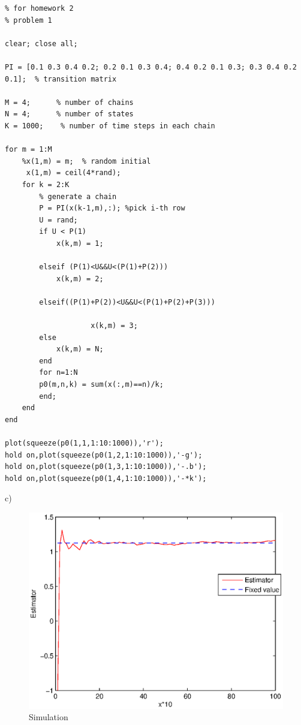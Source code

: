 \documentclass[12pt] {article}
\begin{document}
\begin{lstlisting}
% for homework 2
% problem 1

clear; close all;

PI = [0.1 0.3 0.4 0.2; 0.2 0.1 0.3 0.4; 0.4 0.2 0.1 0.3; 0.3 0.4 0.2 0.1];  % transition matrix

M = 4;      % number of chains
N = 4;      % number of states
K = 1000;    % number of time steps in each chain

for m = 1:M
    %x(1,m) = m;  % random initial
     x(1,m) = ceil(4*rand);
    for k = 2:K
        % generate a chain
        P = PI(x(k-1,m),:); %pick i-th row
        U = rand;
        if U < P(1)
            x(k,m) = 1;
            
        elseif (P(1)<U&&U<(P(1)+P(2)))
            x(k,m) = 2;
            
        elseif((P(1)+P(2))<U&&U<(P(1)+P(2)+P(3)))
                    
                    x(k,m) = 3;
        else
            x(k,m) = N; 
        end
        for n=1:N
        p0(m,n,k) = sum(x(:,m)==n)/k;
        end;
    end
end

plot(squeeze(p0(1,1,1:10:1000)),'r');
hold on,plot(squeeze(p0(1,2,1:10:1000)),'-g');
hold on,plot(squeeze(p0(1,3,1:10:1000)),'-.b');
hold on,plot(squeeze(p0(1,4,1:10:1000)),'-*k');

\end{lstlisting}

c)\\
\begin{figure}
\begin{center}
\includegraphics[height=2.2 in] {hm2_prob1_c.eps}
\caption{Simulation}
\end{center}
\end{figure}
\end{document}
